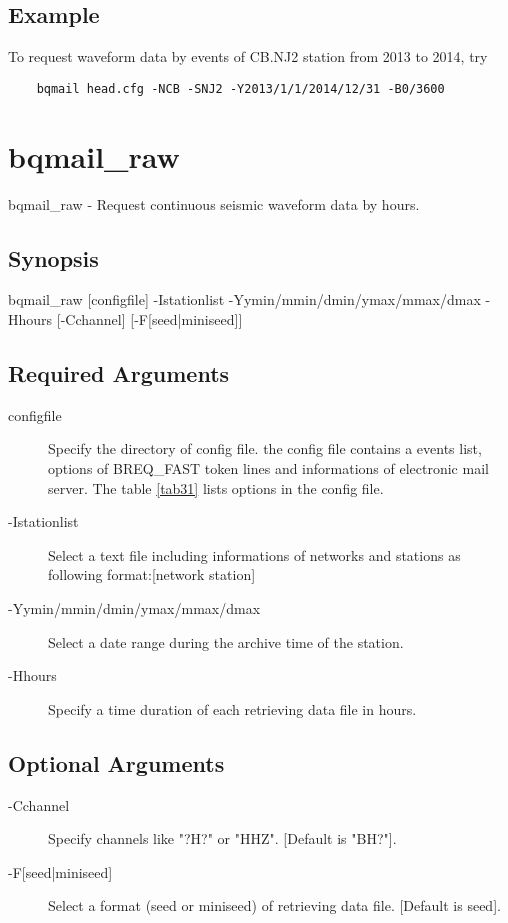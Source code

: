 \documentclass[12pt, a4paper]{report}
\begin{document}
\subsection{Example}
To request waveform data by events of CB.NJ2 station from 2013 to 2014, try
\begin{lstlisting}
	bqmail head.cfg -NCB -SNJ2 -Y2013/1/1/2014/12/31 -B0/3600 
\end{lstlisting} 

\section{bqmail\_raw}
bqmail\_raw - Request continuous seismic waveform data by hours.
\subsection{Synopsis}
{\tb bqmail\_raw} [{\ti configfile}] {\tb -I}{\ti stationlist} {\tb -Y}{\ti ymin/mmin/dmin/ymax/mmax/dmax} {\tb -H}{\ti hours} [{\tb -C}{\ti channel}] [{\tb -F[{\ti seed}|{\ti miniseed}]}]
\subsection{Required Arguments}
\begin{description}
\item[{\ti configfile}] Specify the directory of config file. the config file contains a events list, options of BREQ\_FAST token lines and informations of electronic mail server. The table \ref{tab31} lists options in the config file.
\item[{\tb -I}{\ti stationlist}] Select a text file including informations of networks and stations as following format:[{\ti network station}]
\item[{\tb -Y}{\ti ymin/mmin/dmin/ymax/mmax/dmax}] Select a date range during the archive time of the station.
\item[{\tb -H}{\ti hours}] Specify a time duration of each retrieving data file in hours.
\end{description}
\subsection{Optional Arguments}
\begin{description}
\item[{\tb -C}{\ti channel}] Specify channels like "{\ti ?H?}" or "{\ti HHZ}". [Default is "{\ti BH?}"]. 
\item[{\tb -F[{\ti seed}|{\ti miniseed}]}] Select a format (seed or miniseed) of retrieving data file. [Default is {\ti seed}].
\end{description}
\end{document}
